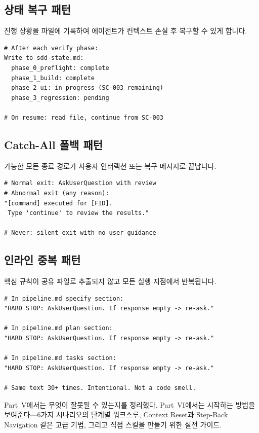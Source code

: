 \documentclass[11pt,a4paper,openright,twoside]{report}
\begin{document}
\subsection{상태 복구 패턴}

진행 상황을 파일에 기록하여 에이전트가 컨텍스트 손실 후 복구할 수 있게 합니다.

\begin{lstlisting}[title={State Recovery Example}]
# After each verify phase:
Write to sdd-state.md:
  phase_0_preflight: complete
  phase_1_build: complete
  phase_2_ui: in_progress (SC-003 remaining)
  phase_3_regression: pending

# On resume: read file, continue from SC-003
\end{lstlisting}

\subsection{Catch-All 폴백 패턴}

가능한 모든 종료 경로가 사용자 인터랙션 또는 복구 메시지로 끝납니다.

\begin{lstlisting}[title={Catch-All Pattern}]
# Normal exit: AskUserQuestion with review
# Abnormal exit (any reason):
"[command] executed for [FID].
 Type 'continue' to review the results."

# Never: silent exit with no user guidance
\end{lstlisting}

\subsection{인라인 중복 패턴}

핵심 규칙이 공유 파일로 추출되지 않고 모든 실행 지점에서 반복됩니다.

\begin{lstlisting}[title={Inline Duplication Example}]
# In pipeline.md specify section:
"HARD STOP: AskUserQuestion. If response empty -> re-ask."

# In pipeline.md plan section:
"HARD STOP: AskUserQuestion. If response empty -> re-ask."

# In pipeline.md tasks section:
"HARD STOP: AskUserQuestion. If response empty -> re-ask."

# Same text 30+ times. Intentional. Not a code smell.
\end{lstlisting}

Part~V에서는 무엇이 잘못될 수 있는지를 정리했다. Part~VI에서는 시작하는 방법을 보여준다---6가지 시나리오의 단계별 워크스루, Context Reset과 Step-Back Navigation 같은 고급 기법, 그리고 직접 스킬을 만들기 위한 실전 가이드.
\end{document}

